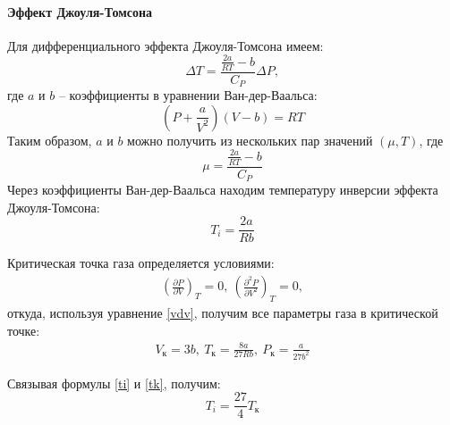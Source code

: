\documentclass[12pt]{article}
\begin{document}
    \paragraph{Эффект Джоуля-Томсона} Для дифференциального эффекта Джоуля-Томсона
    имеем:
    \begin{equation}
        \Delta T = \frac{\frac{2a}{RT} - b}{C_P}\Delta P,
    \end{equation}
    где $a$ и $b$ -- коэффициенты в уравнении Ван-дер-Ваальса:
    \begin{equation}
        \left(P + \frac{a}{V^2}\right)(V - b) = RT
        \label{vdv}
    \end{equation}
    Таким образом, $a$ и $b$ можно получить из нескольких пар значений 
    $(\mu, T)$, где 
    \begin{equation}
        \mu = \frac{\frac{2a}{RT} - b}{C_P}
        \label{mu}
    \end{equation}
    Через коэффициенты Ван-дер-Ваальса находим температуру инверсии эффекта
    Джоуля-Томсона:
    \begin{equation}
        T_i = \frac{2a}{Rb}
        \label{ti}
    \end{equation}

    Критическая точка газа определяется условиями:
    \begin{eqnarray}
        \left(\frac{\partial P}{\partial V}\right)_T = 0, \ \left(\frac{\partial^2 P}{\partial V^2}\right)_T = 0,
    \end{eqnarray}
    откуда, используя уравнение \ref{vdv}, получим все параметры газа в
    критической точке:
    \begin{eqnarray}
        V_{\text{к}} = 3b, \ T_{\text{к}} = \frac{8a}{27Rb}, \ P_{\text{к}} = \frac{a}{27b^2}
        \label{tk}
    \end{eqnarray}
    
    Связывая формулы \ref{ti} и \ref{tk}, получим:
    \begin{equation}
        T_i = \frac{27}{4}T_{\text{к}}
    \end{equation}
    
\end{document}
